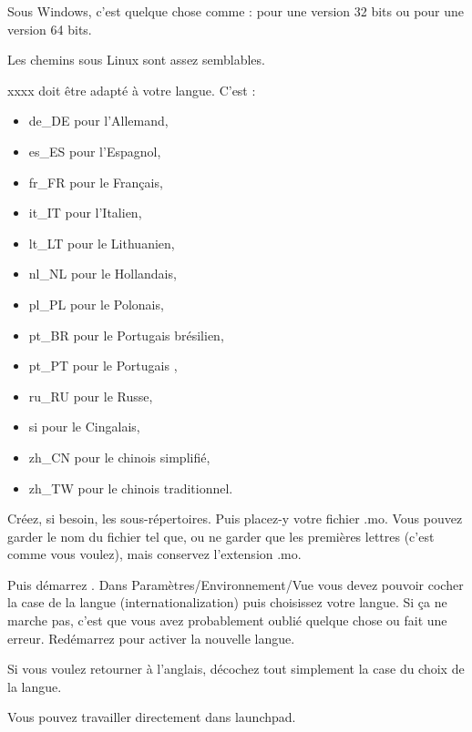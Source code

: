 Sous Windows, c'est quelque chose comme :\newline
{} pour une version 32 bits\newline
 ou\newline
{} pour une version 64 bits.

Les chemins sous Linux sont assez semblables.

xxxx doit être adapté à votre langue. C'est :
\begin{itemize}
\item de\_DE pour l'Allemand,
\item es\_ES pour l'Espagnol,
\item fr\_FR pour le Français,
\item it\_IT pour l'Italien,
\item lt\_LT pour le Lithuanien,
\item nl\_NL pour le Hollandais,
\item pl\_PL pour le Polonais,
\item pt\_BR pour le Portugais brésilien,
\item pt\_PT pour le Portugais ,
\item ru\_RU pour le Russe,
\item si     pour le Cingalais,
\item zh\_CN pour le chinois simplifié,
\item zh\_TW pour le chinois traditionnel.
\end{itemize}

Créez, si besoin, les sous-répertoires. Puis placez-y votre fichier .mo. Vous pouvez garder le nom du fichier tel que, ou ne garder que les premières lettres (c'est comme vous voulez), mais conservez l'extension .mo.

Puis démarrez \codeblocks. Dans Paramètres/Environnement/Vue vous devez pouvoir cocher la case de la langue (internationalization) puis choisissez votre langue. Si ça ne marche pas, c'est que vous avez probablement oublié quelque chose ou fait une erreur.\newline
Redémarrez \codeblocks pour activer la nouvelle langue.

Si vous voulez retourner à l'anglais, décochez tout simplement la case du choix de la langue.

Vous pouvez travailler directement dans launchpad.

